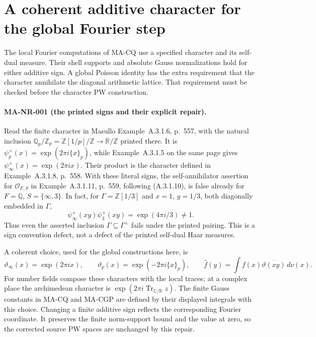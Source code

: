 \section{A coherent additive character for the global Fourier step}
\label{sec:additive-normalization}

The local Fourier computations of MA-CQ use a specified character
and its self-dual measure. Their shell supports and absolute Gauss
normalizations hold for either additive sign. A global Poisson
identity has the extra requirement that the character annihilate
the diagonal arithmetic lattice. That requirement must be checked
before the character PW construction.

\paragraph{MA-NR-001 (the printed signs and their explicit repair).}
Read the finite character in Masullo Example~A.3.1.6, p.~557,
with the natural inclusion
$\mathbb Q_p/\mathbb Z_p=\mathbb Z[1/p]/\mathbb Z\to\mathbb R/\mathbb Z$
printed there. It is
$\psi_p^+(x)=\exp(2\pi i\{x\}_p)$, while
Example~A.3.1.5 on the same page gives
$\psi_\infty^+(x)=\exp(2\pi ix)$.
Their product is the character defined in Example~A.3.1.8,
p.~558. With these literal signs, the self-annihilator assertion
for $\mathcal O_{F,S}$ in Example~A.3.1.11, p.~559,
following (A.3.1.10), is false already for
$F=\mathbb Q$, $S=\{\infty,3\}$.
In fact, for $\Gamma=\mathbb Z[1/3]$ and
$x=1$, $y=1/3$, both diagonally embedded in $\Gamma$,
\[
 \psi_\infty^+(xy)\psi_3^+(xy)
                 =\exp(4\pi i/3)\ne1.
 \tag{MA-NR.1}
\]
Thus even the asserted inclusion
$\Gamma\subseteq\Gamma^\perp$ fails under the printed pairing.
This is a sign convention defect, not a defect of the printed
self-dual Haar measures.

A coherent choice, used for the global constructions here, is
\[
 \vartheta_\infty(x)=\exp(2\pi ix),\qquad
 \vartheta_p(x)=\exp(-2\pi i\{x\}_p),\qquad
 \widehat f(y)=\int f(x)\overline{\vartheta(xy)}\,d\nu(x).
 \tag{MA-NR.2}
\]
For number fields compose these characters with the local traces;
at a complex place the archimedean character is
$\exp(2\pi i\operatorname{Tr}_{\mathbb C/\mathbb R}z)$.
The finite Gauss constants in MA-CQ and MA-CGP are defined by
their displayed integrals with this choice. Changing a finite
additive sign reflects the corresponding Fourier coordinate.
It preserves the finite norm-support bound and the value at zero,
so the corrected source PW spaces are unchanged by this repair.

